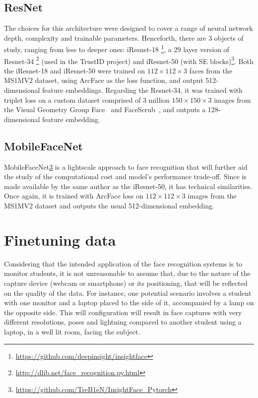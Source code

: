 \documentclass[class=report, crop=false, a4paper, 12pt]{standalone}
\begin{document}
\subsection{ResNet}
The choices for this architecture were designed to cover a range of neural network depth, complexity and trainable parameters. Henceforth, there are 3 objects of study, ranging from less to deeper ones: iResnet-18 \footnote{\url{https://github.com/deepinsight/insightface}}, a 29 layer version of Resnet-34 \footnote{\url{http://dlib.net/face_recognition.py.html}} (used in the TrustID project) and iResnet-50 (with \acrshort{SE} blocks)\footnote{\label{fnote6}\url{https://github.com/TreB1eN/InsightFace_Pytorch}}. Both the iResnet-18 and iResnet-50 were trained on $112\times112\times3$ faces from the MS1MV2 dataset, using ArcFace as the loss function, and output 512-dimensional feature embeddings. Regarding the Resnet-34, it was trained with triplet loss on a custom dataset comprised of 3 million $150\times150\times3$ images from the Visual Geometry Group
Face~\autocite{parkhiDeepFaceRecognition2015} and FaceScrub~\autocite{ngDatadrivenApproachCleaning2014}, and outputs a 128-dimensional feature embedding.

\subsection{MobileFaceNet}
MobileFaceNet\cref{fnote6} is a lightscale approach to face recognition that will further aid the study of the computational cost and model's performance trade-off. Since is made available by the same author as the iResnet-50, it has technical similarities. Once again, it is trained with ArcFace loss on $112\times112\times3$ images from the MS1MV2 dataset and outputs the usual 512-dimensional embedding.


\section{Finetuning data}
Considering that the intended application of the face recognition systems is to monitor students, it is not unreasonable to assume that, due to the nature of the capture device (webcam or smartphone) or its positioning, that will be reflected on the quality of the data. For instance, one potential scenario involves a student with one monitor and a laptop placed to the side of it, accompanied by a lamp on the opposite side. This will configuration will result in face captures with very different resolutions, poses and lightning compared to another student using a laptop, in a well lit room, facing the subject. 
\end{document}
